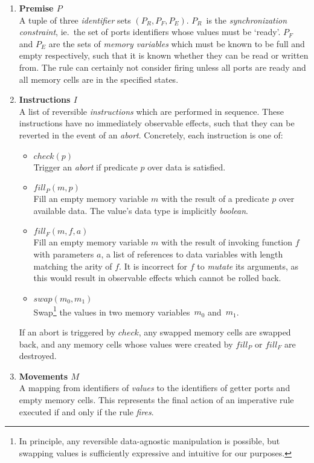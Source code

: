 \begin{enumerate}
	\item \textbf{Premise $P$}\\
	A tuple of three \textit{identifier} sets $(P_R, P_F, P_E)$. $P_R$~is the \textit{synchronization constraint}, ie.\ the set of ports identifiers whose values must be `ready'. $P_F$ and $P_E$ are the sets of \textit{memory variables} which must be known to be full and empty respectively, such that it is known whether they can be read or written from. The rule can certainly not consider firing unless all ports are ready and all memory cells are in the specified states.
	
	\item \textbf{Instructions $I$}\\
	A list of reversible \textit{instructions} which are performed in sequence. These instructions have no immediately observable effects, such that they can be reverted in the event of an \textit{abort}. Concretely, each instruction is one of:
	\begin{itemize}
		\item $check(p)$\\
		Trigger an \textit{abort} if predicate $p$ over data is satisfied.
		\item $fill_P(m, p)$\\Fill an empty memory variable $m$ with the result of a predicate $p$ over available data. The value's data type is implicitly \textit{boolean}.
		\item $fill_F(m, f, a)$\\
		Fill an empty memory variable $m$ with the result of invoking function $f$ with parameters $a$, a list of references to data variables with length matching the arity of $f$. It is incorrect for $f$ to \textit{mutate} its arguments, as this would result in observable effects which cannot be rolled back.
		\item $swap(m_0,m_1)$\\
		Swap\footnote{In principle, any reversible data-agnostic manipulation is possible, but swapping values is sufficiently expressive and intuitive for our purposes.} the values in two memory variables~$m_0$ and~$m_1$.
	\end{itemize}
	If an abort is triggered by $check$, any swapped memory cells are swapped back, and any memory cells whose values were created by $fill_P$ or $fill_F$ are destroyed.
	
	\item \textbf{Movements $M$}\\
	A mapping from identifiers of \textit{values} to the identifiers of getter ports and empty memory cells. This represents the final action of an imperative rule executed if and only if the rule \textit{fires}.
\end{enumerate}

